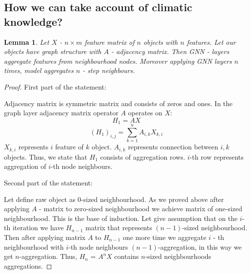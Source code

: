 \documentclass{article}
\begin{document}
\subsection{How we can take account of climatic knowledge?}
\newtheorem{Lemma}{Lemma}
\begin{Lemma}
Let $X$ - $n \times m$ feature matrix of $n$ objects with $n$ features. Let our objects have graph structure with $A$ - adjacency matrix. Then  GNN - layers aggregate features from neighbourhood nodes. Moreover applying GNN layers $n$ times, model aggregates $n$ - step neighbours.
\end{Lemma}
\begin{proof}

First part of the statement:

Adjacency matrix is symmetric matrix and consists of zeros and ones. In the graph layer adjacency matrix operator $A$ operates on $X$:
\begin{equation}
    H_1 = AX
\end{equation}
\begin{equation}
    (H_1)_{i,j} = \sum\limits_{k = 1}^{n}A_{i,k}X_{k,i} 
\end{equation}
$X_{k,i}$ represents $i$ feature of $k$ object. $A_{i,k}$ represents connection between $i, k$ objects. Thus, we state that $H_1$ consists of aggregation rows. $i$-th row represents aggregation of $i$-th node neighbours. 

Second part of the statement:

Let define raw object as 0-sized neighbourhood. As we proved above after applying $A$ - matrix to zero-sized neighbourhood we achieve matrix of one-sized neighbourhood. This is the base of induction. Let give assumption that on the $i$-th iteration we have $H_{n-1}$ matrix that represents $(n-1)$-sized neighbourhood. Then after applying matrix $A$ to $H_{n-1}$ one more time we aggregate $i$ - th neighbourhood with $i$-th node neighbours $(n-1)$-aggregation, in this way we get $n$-aggregation. Thus, $H_n$ = $A^nX$ contains $n$-sized neighbourhoods aggregations.
\end{proof}
\end{document}
